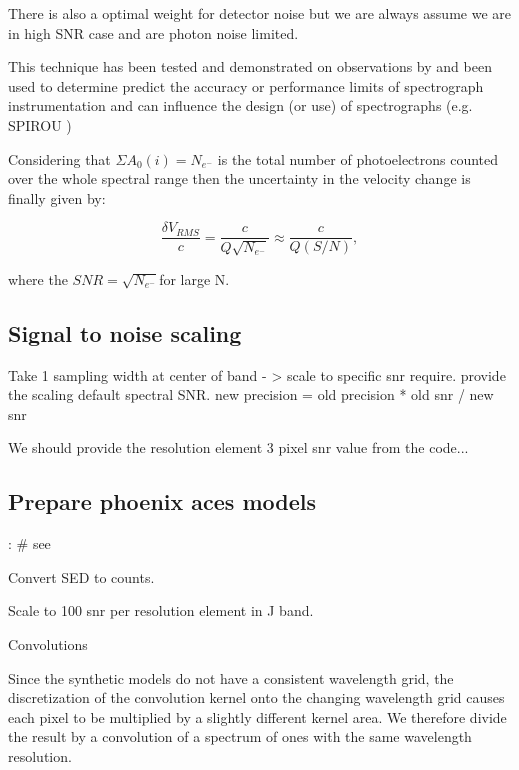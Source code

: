 There is also a optimal weight for detector noise but we are always assume we are in high SNR case and are photon noise limited.

 
This technique has been tested and demonstrated on observations by \citet{connes_demonstration_1996} and been used to determine predict the accuracy or performance limits of spectrograph instrumentation \citet{Connes1985,bouchy_fundamental_2001} and can influence the design (or use) of spectrographs   
 (e.g. SPIROU \citep{artigau_spirou_2014,figueira_radial_2016})


Considering that \(\Sigma{A_0(i)} = N_{e^-} \) is the total number of photoelectrons counted over the whole spectral range then the uncertainty in the velocity change is finally given by:

\begin{equation}
\frac{\delta V_{RMS}}{c} = \frac{c}{Q \sqrt{N_{e^-}}} \approx \frac{c}{Q (S/N)},
\end{equation}

where the \(SNR=\sqrt{N_{e^-}} \)for large N.  




\subsection {Signal to noise scaling}
Take 1 sampling width at center of band - > scale to specific snr require.
provide the scaling default spectral SNR.
new precision = old precision * old snr / new snr

We should provide the resolution element 3 pixel snr value from the code...


\subsection{Prepare phoenix aces models}:
\# see \citet{figueira_radial_2016} 

Convert SED to counts.


Scale to 100 snr per resolution element in J band.

Convolutions


Since the synthetic models do not have a consistent wavelength grid, the discretization of the convolution kernel onto the  changing wavelength grid causes each pixel to be multiplied by  a slightly different kernel area. We therefore divide the result by a convolution of a spectrum of ones with the same wavelength resolution.

